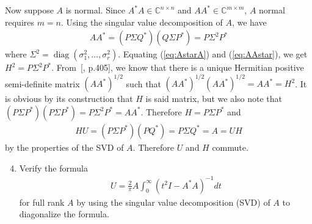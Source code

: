 \documentclass[10pt, A4paper]{article}
\DeclareMathOperator{\diag}{diag}
\begin{document}
Now suppose $A$ is normal. Since $A^*A \in \mathbb{C}^{n\times n}$ and
$AA^* \in \mathbb{C}^{m \times m}$, $A$ normal requires $m=n$.
Using the singular value decomposition of $A$, we have
\begin{align}
	AA^* = (P\Sigma Q^*) (Q\Sigma P^*) = P\Sigma^2 P^*
	\label{eq:AAstar}
\end{align}
where $\Sigma^2 = \diag(\sigma_1^2, \ldots,\sigma_r^2)$.
Equating (\ref{eq:AstarA}) and (\ref{eq:AAstar}), we get 
$H^2 = P\Sigma^2P^*$. From~[\citealp{hojo1985}, p.405], we know 
that there
is a unique Hermitian positive semi-definite matrix $(AA^*)^{1/2}$ such 
that $(AA^*)^{1/2}(AA^*)^{1/2} = AA^* = H^2$.
It is obvious by its construction that $H$ is said matrix, but we also
note that $(P\Sigma P^*) (P\Sigma P^*) = P \Sigma^2P^* = AA^*$.
Therefore $H = P\Sigma P^*$ and
\begin{align}
	HU = (P\Sigma P^*) (PQ^*) = P \Sigma Q^* = A = UH
\end{align}
by the properties of the SVD of $A$. Therefore $U$ and $H$ commute.
 

\begin{enumerate}
	\setcounter{enumi}{3}
	\item Verify the formula
	\begin{align*}
		U = \frac{2}{\pi}A \int_{0}^{\infty} (t^2I - A^*A)^{-1}dt
		\tag{*}
		\label{eq:Q4}
	\end{align*}
	for full rank $A$ by using the singular value decomposition (SVD)
	of $A$ to diagonalize the formula.
\end{enumerate}
\end{document}
